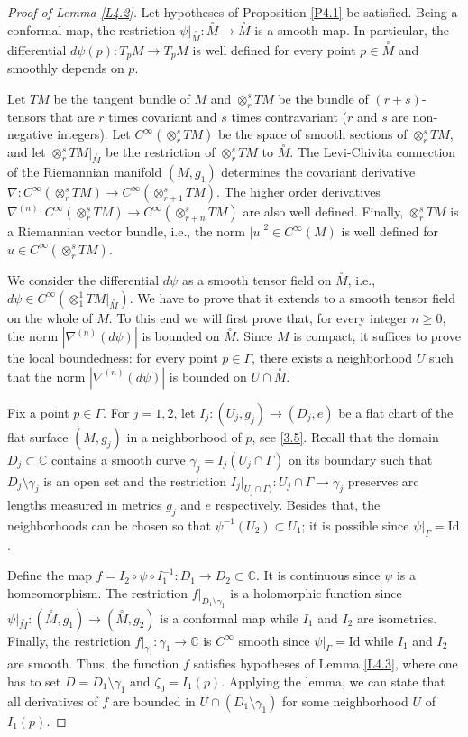 \documentclass[12pt,reqno]{amsart}
\begin{document}
\begin{proof}[Proof of Lemma \ref{L4.2}]
Let hypotheses of Proposition \ref{P4.1} be satisfied. Being a conformal map, the restriction
$\psi|_{\stackrel\circ M}:\stackrel\circ M\to\stackrel\circ M$ is a smooth map. In particular, the differential $d\psi(p):T_pM\to T_pM$ is well defined for every point $p\in\stackrel\circ M$ and smoothly depends on $p$.

Let $TM$ be the tangent bundle of $M$ and $\otimes_r^sTM$ be the bundle of $(r+s)$-tensors that are $r$ times covariant and $s$ times contravariant ($r$ and $s$ are non-negative integers). Let $C^\infty(\otimes_r^sTM)$ be the space of smooth sections of $\otimes_r^sTM$, and let $\otimes_r^sTM|_{\stackrel\circ M}$ be the restriction of $\otimes_r^sTM$ to $\stackrel\circ M$. The Levi-Chivita connection of the Riemannian manifold $(M,g_1)$ determines the covariant derivative
$\nabla:C^\infty(\otimes_r^sTM)\to C^\infty(\otimes_{r+1}^sTM)$. The higher order derivatives
$\nabla^{(n)}:C^\infty(\otimes_r^sTM)\to C^\infty(\otimes_{r+n}^sTM)$ are also well defined. Finally, $\otimes_r^sTM$ is a Riemannian vector bundle, i.e., the norm $|u|^2\in C^\infty(M)$ is well defined for $u\in C^\infty(\otimes_r^sTM)$.

We consider the differential $d\psi$ as a smooth tensor field on $\stackrel\circ M$, i.e.,
$d\psi\in C^\infty(\otimes_1^1TM|_{\stackrel\circ M})$. We have to prove that it extends to a smooth tensor field on the whole of $M$.
To this end we will first prove that, for every integer $n\ge0$, the norm $|\nabla^{(n)}(d\psi)|$ is bounded on $\stackrel\circ M$. Since $M$ is compact, it suffices to prove the local boundedness: for every point $p\in\Gamma$, there exists a neighborhood $U$ such that the norm $|\nabla^{(n)}(d\psi)|$ is bounded on $U\cap\stackrel\circ M$.

Fix a point $p\in\Gamma$.
For $j=1,2$, let $I_j:(U_j,g_j)\to(D_j,e)$ be a flat chart of the flat surface $(M,g_j)$ in a neighborhood of $p$, see \eqref{3.5}. Recall that the domain $D_j\subset{\mathbb C}$ contains a smooth curve $\gamma_j=I_j(U_j\cap\Gamma)$ on its boundary such that $D_j\setminus\gamma_j$ is an open set and the restriction $I_j|_{U_j\cap\Gamma)}:U_j\cap\Gamma\to\gamma_j$ preserves arc lengths measured in metrics $g_j$ and $e$ respectively. Besides that, the neighborhoods can be chosen so that $\psi^{-1}(U_2)\subset U_1$; it is possible since $\psi|_\Gamma=\mbox{Id}$.

Define the map
$
f=I_2\circ\psi\circ I_1^{-1}:D_1\to D_2\subset{\mathbb C}.
$
It is continuous since $\psi$ is a homeomorphism. The restriction $f|_{D_1\setminus\gamma_1}$ is a holomorphic function since
$\psi|_{\stackrel\circ M}:(\stackrel\circ M,g_1)\to(\stackrel\circ M,g_2)$ is a conformal map while $I_1$ and $I_2$ are isometries.
Finally, the restriction $f|_{\gamma_1}:\gamma_1\to{\mathbb C}$ is $C^\infty$ smooth since $\psi|_\Gamma=\mbox{Id}$ while $I_1$ and $I_2$ are smooth. Thus, the function $f$ satisfies hypotheses of Lemma \ref{L4.3}, where one has to set $D=D_1\setminus\gamma_1$ and $\zeta_0=I_1(p)$. Applying the lemma, we can state that all derivatives of $f$ are bounded in $U\cap(D_1\setminus\gamma_1)$ for some neighborhood $U$ of $I_1(p)$.


\end{proof}
\end{document}
